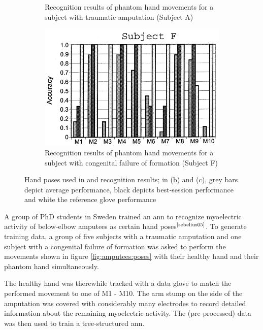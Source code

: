 \documentclass[hyperref, bachelorofscience]{cgvpub}
\newcommand{\newcite}[1]{$ ^{\text{\cite{#1}}} $}
\begin{document}
\begin{figure}
\begin{subfigure}{.3\linewidth}
		\caption{Recognition results of phantom hand movements for a subject with traumatic amputation (Subject A)}
		\label{fig:amputees:a}
	\end{subfigure}
	\hfill
	\begin{subfigure}{.3\linewidth}
		\includegraphics[width=\linewidth]{../pics/amputees_f}
		\caption{Recognition results of phantom hand movements for a subject with congenital failure of formation (Subject F)}
		\label{fig:amputees:f}
	\end{subfigure}
	\caption[Hand poses used in \cite{sebelius05} and recognition results]{Hand poses used in \cite{sebelius05} and recognition results; in (b) and (c), grey bars depict average performance, black depicts best-session performance and white the reference glove performance}
	\label{fig:amputees}
\end{figure}

A group of PhD students in Sweden trained an \acrfull{ann} to recognize myoelectric activity of below-elbow amputees as certain hand poses\newcite{sebelius05}. To generate training data, a group of five subjects with a traumatic amputation and one subject with a congenital failure of formation was asked to perform the movements shown in figure \ref{fig:amputees:poses} with their healthy hand and their phantom hand simultaneously.

The healthy hand was therewhile tracked with a data glove to match the performed movement to one of M1 - M10. The arm stump on the side of the amputation was covered with considerably many electrodes to record detailed information about the remaining myoelectric activity. The (pre-processed) data was then used to train a tree-structured \acrshort{ann}.
\end{document}
